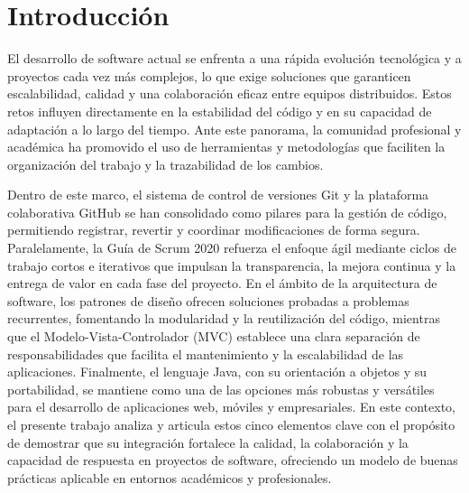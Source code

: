 \section{Introducción}
El desarrollo de software actual se enfrenta a una rápida evolución tecnológica y a proyectos cada vez más complejos, lo que exige soluciones que garanticen escalabilidad, calidad y una colaboración eficaz entre equipos distribuidos. Estos retos influyen directamente en la estabilidad del código y en su capacidad de adaptación a lo largo del tiempo. Ante este panorama, la comunidad profesional y académica ha promovido el uso de herramientas y metodologías que faciliten la organización del trabajo y la trazabilidad de los cambios.

Dentro de este marco, el sistema de control de versiones Git y la plataforma colaborativa GitHub se han consolidado como pilares para la gestión de código, permitiendo registrar, revertir y coordinar modificaciones de forma segura. Paralelamente, la Guía de Scrum 2020 refuerza el enfoque ágil mediante ciclos de trabajo cortos e iterativos que impulsan la transparencia, la mejora continua y la entrega de valor en cada fase del proyecto. En el ámbito de la arquitectura de software, los patrones de diseño ofrecen soluciones probadas a problemas recurrentes, fomentando la modularidad y la reutilización del código, mientras que el Modelo-Vista-Controlador (MVC) establece una clara separación de responsabilidades que facilita el mantenimiento y la escalabilidad de las aplicaciones. Finalmente, el lenguaje Java, con su orientación a objetos y su portabilidad, se mantiene como una de las opciones más robustas y versátiles para el desarrollo de aplicaciones web, móviles y empresariales. En este contexto, el presente trabajo analiza y articula estos cinco elementos clave con el propósito de demostrar que su integración fortalece la calidad, la colaboración y la capacidad de respuesta en proyectos de software, ofreciendo un modelo de buenas prácticas aplicable en entornos académicos y profesionales.
